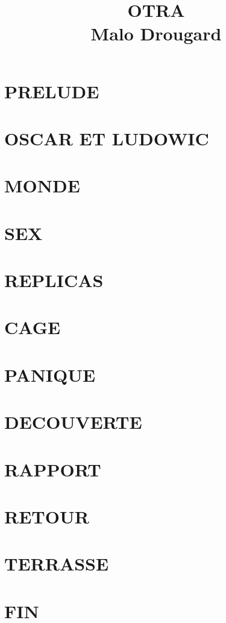 \documentclass[oneside]{book}
\begin{document}
\title{\uppercase{Otra}\\ \vspace{1em } Malo Drougard}
\date{}
\maketitle


\chapter*{PRELUDE}



\chapter*{OSCAR ET LUDOWIC}


\chapter*{MONDE}


\chapter*{SEX}


\chapter*{REPLICAS}


\chapter*{CAGE}


\chapter*{PANIQUE}


\chapter*{DECOUVERTE}


\chapter*{RAPPORT}


\chapter*{RETOUR}


\chapter*{TERRASSE}


\chapter*{FIN}

\end{document}
